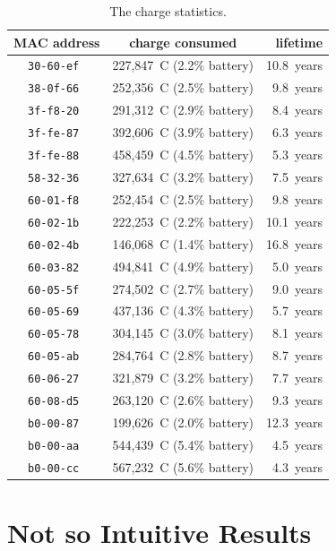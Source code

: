 \documentclass{sig-alternate}
\begin{document}
\begin{table}
  \begin{tabular}{|c|c|r|}
     \hline
     MAC address    & charge consumed           &   lifetime \\
     \hline
     \tt{30-60-ef}  & 227,847~C (2.2\% battery) & 10.8~years \\
     \tt{38-0f-66}  & 252,356~C (2.5\% battery) &  9.8~years \\
     \tt{3f-f8-20}  & 291,312~C (2.9\% battery) &  8.4~years \\
     \tt{3f-fe-87}  & 392,606~C (3.9\% battery) &  6.3~years \\
     \tt{3f-fe-88}  & 458,459~C (4.5\% battery) &  5.3~years \\
     \tt{58-32-36}  & 327,634~C (3.2\% battery) &  7.5~years \\
     \tt{60-01-f8}  & 252,454~C (2.5\% battery) &  9.8~years \\
     \tt{60-02-1b}  & 222,253~C (2.2\% battery) & 10.1~years \\
     \tt{60-02-4b}  & 146,068~C (1.4\% battery) & 16.8~years \\
     \tt{60-03-82}  & 494,841~C (4.9\% battery) &  5.0~years \\
     \tt{60-05-5f}  & 274,502~C (2.7\% battery) &  9.0~years \\
     \tt{60-05-69}  & 437,136~C (4.3\% battery) &  5.7~years \\
     \tt{60-05-78}  & 304,145~C (3.0\% battery) &  8.1~years \\
     \tt{60-05-ab}  & 284,764~C (2.8\% battery) &  8.7~years \\
     \tt{60-06-27}  & 321,879~C (3.2\% battery) &  7.7~years \\
     \tt{60-08-d5}  & 263,120~C (2.6\% battery) &  9.3~years \\
     \tt{b0-00-87}  & 199,626~C (2.0\% battery) & 12.3~years \\
     \tt{b0-00-aa}  & 544,439~C (5.4\% battery) &  4.5~years \\
     \tt{b0-00-cc}  & 567,232~C (5.6\% battery) &  4.3~years \\
     \hline
  \end{tabular}
  \caption{The charge statistics.}
  \label{tab:stats_charge}
\end{table}

\section{Not so Intuitive Results}
\label{sec:notsointuitive}
\end{document}
